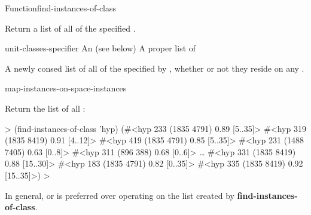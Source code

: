 \documentclass[10pt,twoside,english,pdftex]{article}
\begin{document}
\begin{functiondoc}{Function}{find-instances-of-class}%
  {
    \returns{} }
%
%
%

\fnsyntax

\fnpurpose Return a list of all  of the
specified .

\fnpackage {}

\fnmodule {}

\fnargs
\begin{args}{unit-classes-specifier}
 An 
(see below)
 A proper list of 
\end{args}

\fnreturns
{}%
%
A newly consed list of all  of the
 specified by ,
whether or not they reside on any .

\fndsyntax
\W\supp\tabletop
\unitclassesspec
\subclassingspec

\begin{alsos}{map-instances-on-space-instances}
\end{alsos}

\fnexample
Return the list of all  :
%
\W\supp
\begin{example}
  > (find-instances-of-class 'hyp)
  (#<hyp 233 (1835 4791) 0.89 [5..35]>
   #<hyp 319 (1835 8419) 0.91 [4..12]>
   #<hyp 419 (1835 4791) 0.85 [5..35]>
   #<hyp 231 (1488 7405) 0.63 [0..8]>
   #<hyp 311 (896 388) 0.68 [0..6]> 
     \textrm{\ldots{}}
   #<hyp 331 (1835 8419) 0.88 [15..30]>
   #<hyp 183 (1835 4791) 0.82 [0..35]>
   #<hyp 335 (1835 8419) 0.92 [15..35]>)
  >
\end{example} 

\fnnote In general, \textbf{} or
\textbf{} is preferred over operating
on the list created by \textbf{find-instances-of-class}.

\end{functiondoc}
\end{document}
